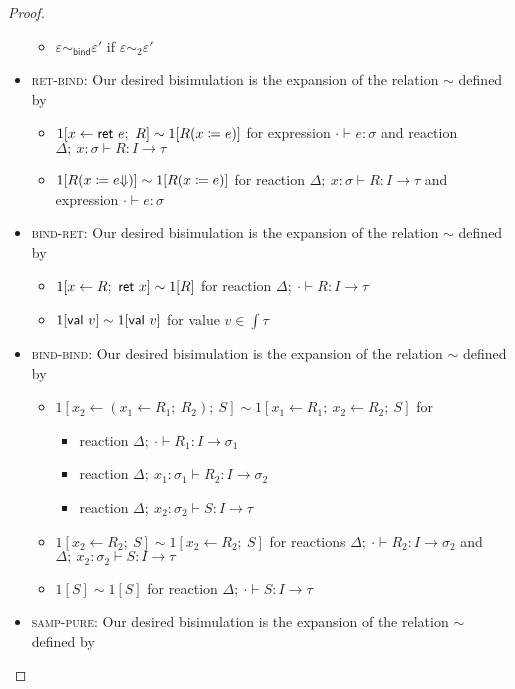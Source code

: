 \begin{proof}
\begin{itemize}
\begin{itemize}
\begin{itemize}
\end{itemize}
\item $\varepsilon \sim_\mathsf{bind} \varepsilon'$ if $\varepsilon \sim_2 \varepsilon'$
\end{itemize}
\item \textsc{ret-bind}: Our desired bisimulation is the expansion of the relation $\sim$ defined by
\begin{itemize}
\item $1[x \leftarrow \mathsf{ret} \ e; \ R] \sim 1[R(x \coloneqq e)]$ for expression $\cdot \vdash e : \sigma$ and reaction $\Delta; \ x : \sigma \vdash R : I \to \tau$
\item $1[R(x \coloneqq {e \hspace{-2.5pt} \Downarrow})] \sim 1[R(x \coloneqq e)]$ for reaction $\Delta; \ x : \sigma \vdash R : I \to \tau$ and expression $\cdot \vdash e : \sigma$
\end{itemize}
\item \textsc{bind-ret}: Our desired bisimulation is the expansion of the relation $\sim$ defined by
\begin{itemize}
\item $1[x \leftarrow R; \ \mathsf{ret} \ x] \sim 1[R]$ for reaction $\Delta; \ \cdot \vdash R : I \to \tau$
\item $1[\mathsf{val} \ v] \sim 1[\mathsf{val} \ v]$ for value $v \in \int{\tau}$
\end{itemize}
\item \textsc{bind-bind}: Our desired bisimulation is the expansion of the relation $\sim$ defined by
\begin{itemize}
\item $1[x_2 \leftarrow (x_1 \leftarrow R_1; \ R_2); \ S] \sim 1[x_1 \leftarrow R_1; \ x_2 \leftarrow R_2; \ S]$ for
\begin{itemize}
\item reaction $\Delta; \ \cdot \vdash R_1 : I \to \sigma_1$
\item reaction $\Delta; \ x_1 : \sigma_1 \vdash R_2 : I \to \sigma_2$
\item reaction $\Delta; \ x_2 : \sigma_2 \vdash S : I \to \tau$
\end{itemize}
\item $1[x_2 \leftarrow R_2; \ S] \sim 1[x_2 \leftarrow R_2; \ S]$ for reactions $\Delta; \ \cdot \vdash R_2 : I \to \sigma_2$ and $\Delta; \ x_2 : \sigma_2 \vdash S : I \to \tau$
\item $1[S] \sim 1[S]$ for reaction $\Delta; \ \cdot \vdash S : I \to \tau$
\end{itemize}
\item \textsc{samp-pure}: Our desired bisimulation is the expansion of the relation $\sim$ defined by

\end{itemize}
\end{proof}
